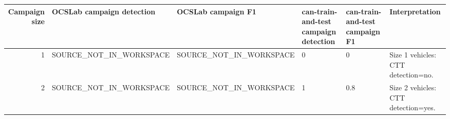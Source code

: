 \begin{tabular}{rlllll}
\toprule
Campaign size & OCSLab campaign detection & OCSLab campaign F1 & can-train-and-test campaign detection & can-train-and-test campaign F1 & Interpretation \\
\midrule
1 & SOURCE_NOT_IN_WORKSPACE & SOURCE_NOT_IN_WORKSPACE & 0 & 0 & Size 1 vehicles: CTT detection=no. \\
2 & SOURCE_NOT_IN_WORKSPACE & SOURCE_NOT_IN_WORKSPACE & 1 & 0.8 & Size 2 vehicles: CTT detection=yes. \\
\bottomrule
\end{tabular}
